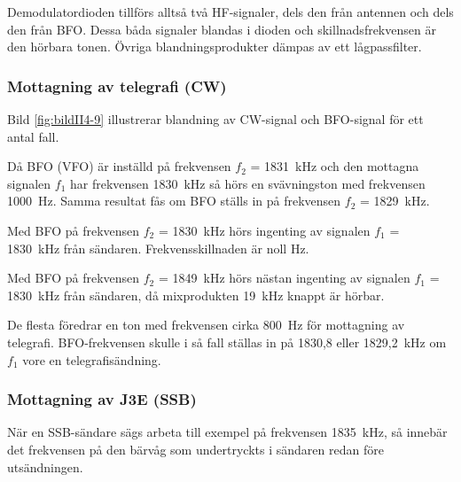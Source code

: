 Demodulatordioden tillförs alltså två HF-signaler, dels den från
antennen och dels den från BFO.
Dessa båda signaler blandas i dioden och skillnadsfrekvensen är den hörbara
tonen.
Övriga blandningsprodukter dämpas av ett lågpassfilter.



\subsubsection{Mottagning av telegrafi (CW)}

Bild \ref{fig:bildII4-9} illustrerar blandning av CW-signal och BFO-signal
för ett antal fall.

Då BFO (VFO) är inställd på frekvensen \(f_2\) = 1831~kHz och den
mottagna signalen \(f_1\) har frekvensen 1830~kHz så hörs en
svävningston med frekvensen \SI{1000}{\hertz}.
Samma resultat fås om BFO ställs in på frekvensen \(f_2\) = 1829~kHz.

Med BFO på frekvensen \(f_2\) = 1830~kHz hörs ingenting av signalen
\(f_1\) = 1830~kHz från sändaren.
Frekvensskillnaden är noll Hz.

Med BFO på frekvensen \(f_2\) = 1849~kHz hörs nästan ingenting av signalen
\(f_1\) = 1830~kHz från sändaren, då mixprodukten 19~kHz knappt är hörbar.

De flesta föredrar en ton med frekvensen cirka \SI{800}{\hertz} för mottagning
av telegrafi.
BFO-frekvensen skulle i så fall ställas in på 1830,8 eller 1829,2~kHz om \(f_1\)
vore en telegrafisändning.


\subsubsection{Mottagning av J3E (SSB)}

När en SSB-sändare sägs arbeta till exempel på frekvensen
\SI{1835}{\kilo\hertz}, så innebär det frekvensen på den bärvåg som undertryckts
i sändaren redan före utsändningen.

